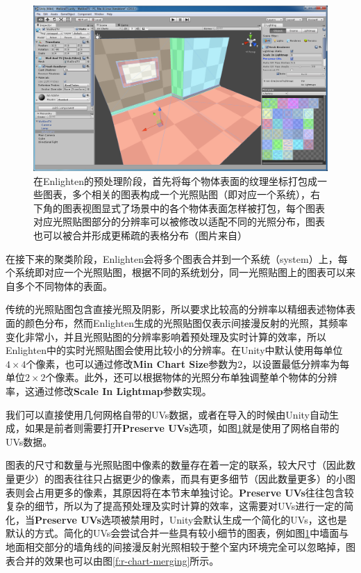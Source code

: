 \begin{figure}
\begin{fullwidth}
	\includegraphics[width=1.0\thewidth]{figures/r/packing}
	\caption{在Enlighten的预处理阶段，首先将每个物体表面的纹理坐标打包成一些图表，多个相关的图表构成一个光照贴图（即对应一个系统），右下角的图表视图显式了场景中的各个物体表面怎样被打包，每个图表对应光照贴图部分的分辨率可以被修改以适配不同的光照分布，图表也可以被合并形成更稀疏的表格分布（图片来自\cite{a:ARMGuideforUnityDevelopersOptimizingMobileGamingGraphics}）}
	\label{f:r-packing}
\end{fullwidth}
\end{figure}

在接下来的聚类阶段，Enlighten会将多个图表合并到一个系统（system）上，每个系统即对应一个光照贴图，根据不同的系统划分，同一光照贴图上的图表可以来自多个不同物体的表面。

传统的光照贴图包含直接光照及阴影，所以要求比较高的分辨率以精细表述物体表面的颜色分布，然而Enlighten生成的光照贴图仅表示间接漫反射的光照，其频率变化非常小，并且光照贴图的分辨率影响着预处理及实时计算的效率，所以Enlighten中的实时光照贴图会使用比较小的分辨率。在Unity中默认使用每单位$4\times 4$个像素，也可以通过修改\textbf{Min Chart Size}参数为2，以设置最低分辨率为每单位$2\times 2$个像素。此外，还可以根据物体的光照分布单独调整单个物体的分辨率，这通过修改\textbf{Scale In Lightmap}参数实现。

我们可以直接使用几何网格自带的UVs数据，或者在导入的时候由Unity自动生成，如果是前者则需要打开\textbf{Preserve UVs}选项，如图\ref{f:r-packing}就是使用了网格自带的UVs数据。

图表的尺寸和数量与光照贴图中像素的数量存在着一定的联系，较大尺寸（因此数量更少）的图表往往只占据更少的像素，而具有更多细节（因此数量更多）的小图表则会占用更多的像素，其原因将在本节末单独讨论。\textbf{Preserve UVs}往往包含较复杂的细节，所以为了提高预处理及实时计算的效率，这需要对UVs进行一定的简化，当\textbf{Preserve UVs}选项被禁用时，Unity会默认生成一个简化的UVs，这也是默认的方式。简化的UVs会尝试合并一些具有较小细节的图表，例如图\ref{f:r-packing}中墙面与地面相交部分的墙角线的间接漫反射光照相较于整个室内环境完全可以忽略掉，图表合并的效果也可以由图\ref{f:r-chart-merging}所示。

